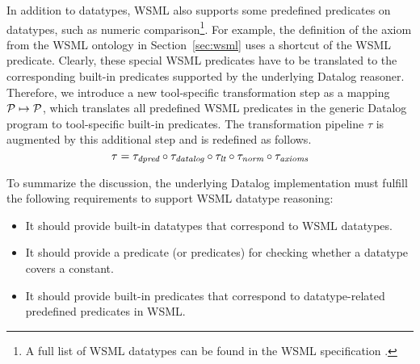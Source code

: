 In addition to datatypes, WSML also supports some predefined
predicates on datatypes, such as numeric comparison\footnote{A
full list of WSML datatypes can be found in the WSML specification
\cite{wsml-spec}.}. For example, the definition of the
 axiom from the WSML
ontology in Section~\ref{sec:wsml} uses a shortcut of the WSML
 predicate. Clearly, these special WSML
predicates have to be translated to the corresponding built-in
predicates supported by the underlying Datalog reasoner.
Therefore, we introduce a new tool-specific transformation step
\transdpred as a mapping $\P \mapsto \P$, which translates all
predefined WSML predicates in the generic Datalog program to
tool-specific built-in predicates. The transformation pipeline
$\tau$ is augmented by this additional step and is redefined as
follows.
\begin{displaymath}
    \tau = \transdpred \circ \transdlog \circ \translt \circ \transnorm \circ \transax
\end{displaymath}

To summarize the discussion, the underlying Datalog implementation
must fulfill the following requirements to support WSML datatype
reasoning:
\begin{itemize}
    \item It should provide built-in datatypes that correspond to WSML datatypes.
    \item It should provide a predicate (or predicates) for checking whether a datatype covers a constant.
    \item It should provide built-in predicates that correspond to datatype-related predefined predicates in WSML.
\end{itemize}
